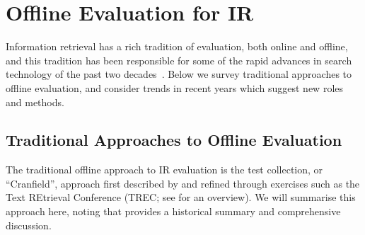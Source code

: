 \section{Offline Evaluation for IR}

Information retrieval has a rich tradition of evaluation, both online and offline, and this tradition has been responsible for some of the rapid advances in search technology of the past two decades~\citep{TRECimpact}. Below we survey traditional approaches to offline evaluation, and consider trends in recent years which suggest new roles and methods.

\subsection{Traditional Approaches to Offline Evaluation}

The traditional offline approach to IR evaluation is the test collection, or ``Cranfield'', approach first described by \cite{cleverdon67} and refined through exercises such as the Text REtrieval Conference (TREC; see \cite{voor:trec05} for an overview).  We will summarise this approach here, noting that \cite{INR-009} provides a historical summary and comprehensive discussion.

